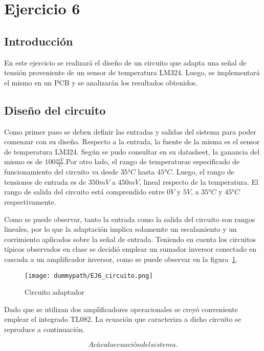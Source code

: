 
\section{Ejercicio 6}

\subsection{Introducción}

En este ejercicio se realizará el diseño de un circuito que adapta una señal de tensión proveniente de un sensor de temperatura LM324. 
Luego, se implementará el mismo en un PCB y se analizarán los resultados obtenidos.

\subsection{Diseño del circuito}

Como primer paso se deben definir las entradas y salidas del sistema para poder comenzar con su diseño. Respecto a la entrada, la fuente de la misma es el sensor de temperatura LM324.
 Según se pudo consultar en su datasheet, la ganancia del mismo es de $100 \frac{mV}{°C}$.Por otro lado, el rango de temperaturas especificado de funcionamiento del circuito va desde $35°C$ hasta $45°C$.
 Luego, el rango de tensiones de entrada es de $350mV$ a $450mV$, lineal respecto de la temperatura. El rango de salida del circuito está comprendido entre $0V$ y $5V$, a  $35°C$ y $45°C$ respectivamente. 

 
 Como se puede observar, tanto la entrada como la salida del circuito son rangos lineales, por lo que la adaptación implica solamemte un escalamiento y un corrimiento aplicados sobre la señal de entrada.
  Teniendo en cuenta los circuitos típicos observados en clase se decidió emplear un sumador inversor conectado en cascada a un amplificador inversor, como se puede observar en la figura~\ref{fig:EJ6_circuito}.  
  
\begin{figure}[H]
    \centering
    \texttt{[image: dummypath/EJ6\_circuito.png]}
    \caption{Circuito adaptador}
    \label{fig:EJ6_circuito} 
\end{figure}

Dado que se utilizan dos amplificadores operacionales se creyó conveniente emplear el integrado TL082. La ecuación que caracteriza a dicho circuito se reproduce a continuación.

\begin{equation}[H]
    Acá va la ecuación del sistema.
    \label{fig:EJ6_ecuacion_sistema} 
\end{equation}

